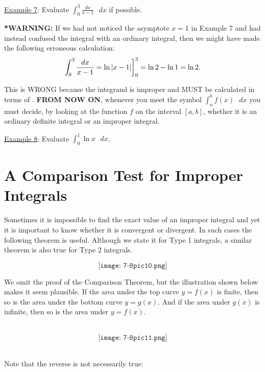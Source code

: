 \documentclass[paper=a4, fontsize=11pt]{scrartcl} %
\numberwithin{equation}{section} %
\numberwithin{figure}{section} %
\numberwithin{table}{section} %
\newcommand{\ds}{\displaystyle}
\begin{document}
\newpage
\underline{Example 7}: Evaluate $\ds\int_0^3\ds\frac{dx}{x-1}\text{ }dx$ if possible.\\
\indent

\vspace{6.6in}

\textbf{*WARNING:} If we had not noticed the asymptote $x=1$ in Example 7 and had instead confused the integral with an ordinary integral, then we might have made the following erroneous calculation:
\[\ds\int_0^3\ds\frac{dx}{x-1} = \ln|x-1|\bigg{]}_0^3 = \ln 2 - \ln 1 = \ln 2.\]

This is WRONG because the integrand is improper and MUST be calculated in terms of \underline{\hspace{1in}}. \textbf{FROM NOW ON}, whenever you meet the symbol $\ds\int_a^b f(x)\text{ }dx$ you must decide, by looking at the function $f$ on the interval $[a,b]$, whether it is an ordinary definite integral or an improper integral.\\
\indent

\newpage

\underline{Example 8}: Evaluate $\ds\int_0^1 \ln x \text{ }dx$.\\
\indent

\newpage
\section*{A Comparison Test for Improper Integrals}
Sometimes it is impossible to find the exact value of an improper integral and yet it is important to know whether it is convergent or divergent. In such cases the following theorem is useful. Although we state it for Type 1 integrals, a similar theorem is also true for Type 2 integrals.

\[\texttt{[image: 7-8pic10.png]}\]

We omit the proof of the Comparison Theorem, but the illustration shown below makes it seem plausible. If the area under the top curve $y=f(x)$ is finite, then so is the area under the bottom curve $y=g(x)$. And if the area under $g(x)$ is infinite, then so is the area under $y=f(x)$. \\
\indent\\
\indent


\[\texttt{[image: 7-8pic11.png]}\]
\indent\\
\indent

Note that the reverse is not necessarily true: \\
\indent
\end{document}
